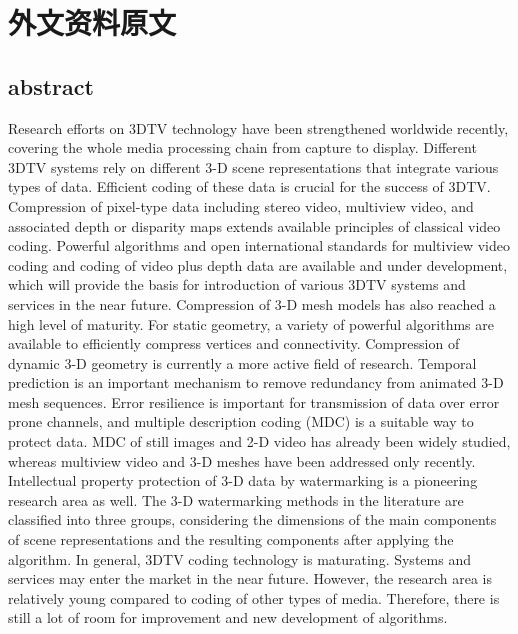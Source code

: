 
\chapter{外文资料原文}
\label{cha:engorg}

\section{abstract}

Research efforts on 3DTV technology have been strengthened worldwide recently, covering the whole media processing chain from capture to display. Different 3DTV systems rely on different 3-D scene representations that integrate various types of data. Efficient coding of these data is crucial for the success of 3DTV. Compression of pixel-type data including stereo video, multiview video, and associated depth or disparity maps extends available principles of classical video coding. Powerful algorithms and open international standards for multiview video coding and coding of video plus depth data are available and under development, which will provide the basis for introduction of various 3DTV systems and services in the near future. Compression of 3-D mesh models has also reached a high level of maturity. For static geometry, a variety of powerful algorithms are available to efficiently compress vertices and connectivity. Compression of dynamic 3-D geometry is currently a more active field of research. Temporal prediction is an important mechanism to remove redundancy from animated 3-D mesh sequences. Error resilience is important for transmission of data over error prone channels, and multiple description coding (MDC) is a suitable way to protect data. MDC of still images and 2-D video has already been widely studied, whereas multiview video and 3-D meshes have been addressed only recently. Intellectual property protection of 3-D data by watermarking is a pioneering research area as well. The 3-D watermarking methods in the literature are classified into three groups, considering the dimensions of the main components of scene representations and the resulting components after applying the algorithm. In general, 3DTV coding technology is maturating. Systems and services may enter the market in the near future. However, the research area is relatively young compared to coding of other types of media. Therefore, there is still a lot of room for improvement and new development of algorithms.

